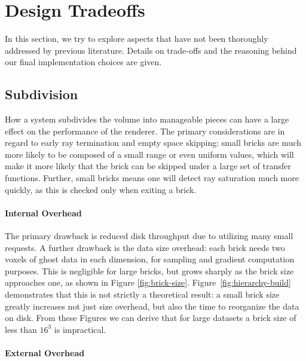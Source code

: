 \section{Design Tradeoffs}
\label{sec:tradeoffs}

In this section, we try to explore aspects that have not been
thoroughly addressed by previous literature.  Details on trade-offs and
the reasoning behind our final implementation choices are given.


\subsection{Subdivision}
\label{sec:subdivision}

How a system subdivides the volume into manageable pieces can have
a large effect on the performance of the renderer.  The primary
considerations are in regard to early ray termination and empty space
skipping: small bricks are much more likely to be composed of a small
range or even uniform values, which will make it more likely that the
brick can be skipped under a large set of transfer functions.  Further,
small bricks means one will detect ray saturation much more quickly, as
this is checked only when exiting a brick.

\paragraph{Internal Overhead}

The primary drawback is reduced disk throughput due to utilizing many
small requests.  A further drawback is the data size overhead: each
brick needs two voxels of ghost data in each dimension, for sampling
and gradient computation purposes.  This is negligible for large
bricks, but grows sharply as the brick size approaches one, as shown in
Figure
\ref{fig:brick-size}. Figure~\ref{fig:hierarchy-build} demonstrates
that this is not strictly a theoretical result: a small brick size
greatly increases not just size overhead, but also the time to
reorganize the data on disk.  From these Figures we can derive that for
large datasets a brick size of less than $16^3$ is impractical.

\paragraph{External Overhead}

